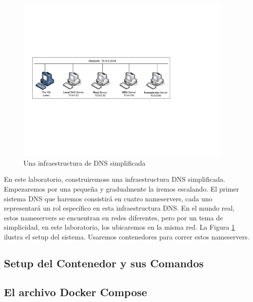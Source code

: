\begin{figure}[htb]
\begin{center}
\includegraphics[width=0.95\textwidth]{Figs/DNS-in-a-box.pdf}
\end{center}
\caption{Una infraestructura de DNS simplificada}
\label{dns:fig:dns-in-a-box}
\end{figure}

En este laboratorio, construiremoss una infraestructura DNS simplificada. Empezaremos por una pequeña y gradualmente la iremos escalando.
El primer sistema DNS que haremos consistirá en cuatro nameservers, cada uno representará un rol específico en esta infraestructura DNS.
En el mundo real, estos nameservers se encuentran en redes diferentes, pero por un tema de simplicidad, en este laboratorio, los ubicaremos en la misma red.
La Figura \ref{dns:fig:dns-in-a-box} ilustra el setup del sistema.
Usaremos contenedores para correr estos nameservers.

\subsection{Setup del Contenedor y sus Comandos}





\subsection{El archivo Docker Compose} 

